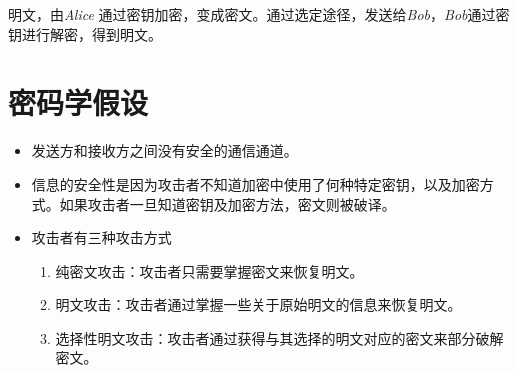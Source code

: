 \documentclass{article}
\begin{document}
明文，由\textit{Alice }通过密钥加密，变成密文。通过选定途径，发送给\textit{Bob}，\textit{Bob}通过密钥进行解密，得到明文。

\section{密码学假设}
\begin{itemize}
\item 发送方和接收方之间没有安全的通信通道。
\item 信息的安全性是因为攻击者不知道加密中使用了何种特定密钥，以及加密方式。如果攻击者一旦知道密钥及加密方法，密文则被破译。
\item 攻击者有三种攻击方式
\begin{enumerate}
\item 纯密文攻击：攻击者只需要掌握密文来恢复明文。
\item 明文攻击：攻击者通过掌握一些关于原始明文的信息来恢复明文。
\item 选择性明文攻击：攻击者通过获得与其选择的明文对应的密文来部分破解密文。
\end{enumerate}
\end{itemize}
\end{document}
